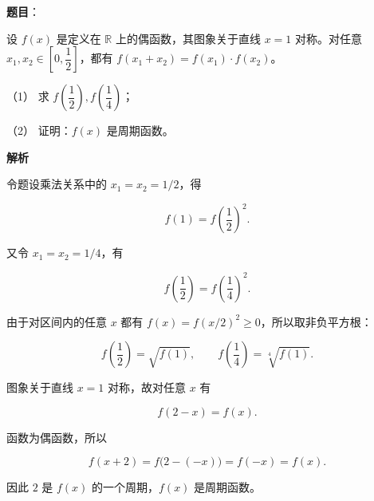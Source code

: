 \begin{answer}

\textbf{题目}：

设 $f(x)$ 是定义在 $\mathbb R$ 上的偶函数，其图象关于直线 $x=1$ 对称。对任意 $x_1,x_2\in\left[0,\dfrac12\right]$，都有 $f(x_1+x_2)=f(x_1)\cdot f(x_2)$。

（1） 求 $f\left(\dfrac12\right),f\left(\dfrac14\right)$；

（2） 证明：$f(x)$ 是周期函数。

\textbf{解析}


令题设乘法关系中的 $x_1=x_2=1/2$，得

\nopagebreak[4]
\[
f(1)=f\left(\frac12\right)^2.
\]

又令 $x_1=x_2=1/4$，有

\nopagebreak[4]
\[
f\left(\frac12\right)=f\left(\frac14\right)^2.
\]

由于对区间内的任意 $x$ 都有 $f(x)=f(x/2)^2\ge0$，所以取非负平方根：

\nopagebreak[4]
\[
f\left(\frac12\right)=\sqrt{f(1)},\qquad
f\left(\frac14\right)=\sqrt[4]{f(1)}.
\]


图象关于直线 $x=1$ 对称，故对任意 $x$ 有

\nopagebreak[4]
\[
f(2-x)=f(x).
\]

函数为偶函数，所以

\nopagebreak[4]
\[
f(x+2)=f\bigl(2-(-x)\bigr)=f(-x)=f(x).
\]

因此 $2$ 是 $f(x)$ 的一个周期，$f(x)$ 是周期函数。



\end{answer}
